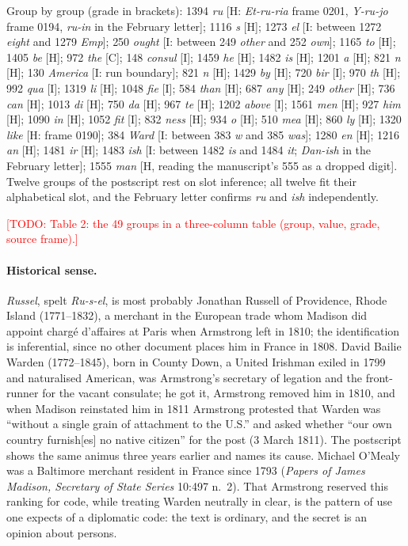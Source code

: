 \documentclass[11pt]{article}
\newcommand{\todo}[1]{\textcolor{red}{[TODO: #1]}}
\newcommand{\grp}[1]{\textsf{#1}}
\begin{document}
Group by group (grade in brackets): \grp{1394} \emph{ru} [H: \emph{Et-ru-ria} frame 0201, \emph{Y-ru-jo} frame 0194, \emph{ru-in} in the February letter]; \grp{1116} \emph{s} [H]; \grp{1273} \emph{el} [I: between \grp{1272} \emph{eight} and \grp{1279} \emph{Emp}]; \grp{250} \emph{ought} [I: between \grp{249} \emph{other} and \grp{252} \emph{own}]; \grp{1165} \emph{to} [H]; \grp{1405} \emph{be} [H]; \grp{972} \emph{the} [C]; \grp{148} \emph{consul} [I]; \grp{1459} \emph{he} [H]; \grp{1482} \emph{is} [H]; \grp{1201} \emph{a} [H]; \grp{821} \emph{n} [H]; \grp{130} \emph{America} [I: run boundary]; \grp{821} \emph{n} [H]; \grp{1429} \emph{by} [H]; \grp{720} \emph{bir} [I]; \grp{970} \emph{th} [H]; \grp{992} \emph{qua} [I]; \grp{1319} \emph{li} [H]; \grp{1048} \emph{fie} [I]; \grp{584} \emph{than} [H]; \grp{687} \emph{any} [H]; \grp{249} \emph{other} [H]; \grp{736} \emph{can} [H]; \grp{1013} \emph{di} [H]; \grp{750} \emph{da} [H]; \grp{967} \emph{te} [H]; \grp{1202} \emph{above} [I]; \grp{1561} \emph{men} [H]; \grp{927} \emph{him} [H]; \grp{1090} \emph{in} [H]; \grp{1052} \emph{fit} [I]; \grp{832} \emph{ness} [H]; \grp{934} \emph{o} [H]; \grp{510} \emph{mea} [H]; \grp{860} \emph{ly} [H]; \grp{1320} \emph{like} [H: frame 0190]; \grp{384} \emph{Ward} [I: between \grp{383} \emph{w} and \grp{385} \emph{was}]; \grp{1280} \emph{en} [H]; \grp{1216} \emph{an} [H]; \grp{1481} \emph{ir} [H]; \grp{1483} \emph{ish} [I: between \grp{1482} \emph{is} and \grp{1484} \emph{it}; \emph{Dan-ish} in the February letter]; \grp{1555} \emph{man} [H, reading the manuscript's \grp{555} as a dropped digit]. Twelve groups of the postscript rest on slot inference; all twelve fit their alphabetical slot, and the February letter confirms \emph{ru} and \emph{ish} independently.

\todo{Table 2: the 49 groups in a three-column table (group, value, grade, source frame).}

\paragraph{Historical sense.} \emph{Russel}, spelt \emph{Ru-s-el}, is most probably Jonathan Russell of Providence, Rhode Island (1771--1832), a merchant in the European trade whom Madison did appoint charg\'e d'affaires at Paris when Armstrong left in 1810; the identification is inferential, since no other document places him in France in 1808. David Bailie Warden (1772--1845), born in County Down, a United Irishman exiled in 1799 and naturalised American, was Armstrong's secretary of legation and the front-runner for the vacant consulate; he got it, Armstrong removed him in 1810, and when Madison reinstated him in 1811 Armstrong protested that Warden was ``without a single grain of attachment to the U.S.'' and asked whether ``our own country furnish[es] no native citizen'' for the post (3 March 1811). The postscript shows the same animus three years earlier and names its cause. Michael O'Mealy was a Baltimore merchant resident in France since 1793 (\emph{Papers of James Madison, Secretary of State Series} 10:497 n.~2). That Armstrong reserved this ranking for code, while treating Warden neutrally in clear, is the pattern of use one expects of a diplomatic code: the text is ordinary, and the secret is an opinion about persons.
\end{document}
